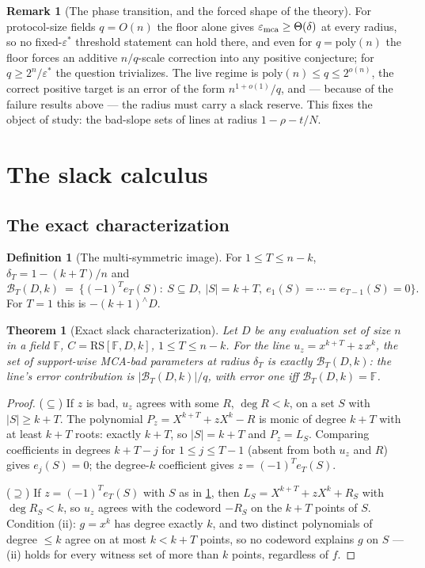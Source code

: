 \documentclass[11pt]{article}
\newtheorem{theorem}{Theorem}[section]
\theoremstyle{definition}
\newtheorem{definition}[definition]{Definition}
\newtheorem{remark}[remark]{Remark}
\newcommand{\F}{\mathbb F}
\newcommand{\eps}{\varepsilon}
\newcommand{\RS}{\mathrm{RS}}
\newcommand{\emca}{\eps_{\rm mca}}
\begin{document}
\begin{remark}[The phase transition, and the forced shape of the theory]\label{rem:phase}
For protocol-size fields $q=O(n)$ the floor alone gives $\emca\ge\Theta(\delta)$ at every radius, so no fixed-$\eps^*$ threshold statement can hold there, and even for $q=\mathrm{poly}(n)$ the floor forces an additive $n/q$-scale correction into any positive conjecture; for $q\ge2^n/\eps^*$ the question trivializes.  The live regime is $\mathrm{poly}(n)\le q\le2^{o(n)}$, the correct positive target is an error of the form $n^{1+o(1)}/q$, and --- because of the failure results above --- the radius must carry a slack reserve.  This fixes the object of study: the bad-slope sets of lines at radius $1-\rho-t/N$.
\end{remark}

\section{The slack calculus}\label{sec:calculus}

\subsection{The exact characterization}

\begin{definition}[The multi-symmetric image]\label{def:badset}
For $1\le T\le n-k$, $\delta_T=1-(k+T)/n$ and
\[
        \mathcal B_T(D,k)\ =\ \big\{(-1)^Te_T(S):\ S\subseteq D,\ |S|=k+T,\ e_1(S)=\cdots=e_{T-1}(S)=0\big\}.
\]
For $T=1$ this is $-(k+1)^{\wedge}D$.
\end{definition}

\begin{theorem}[Exact slack characterization]\label{thm:exactslack}
Let $D$ be \emph{any} evaluation set of size $n$ in a field $\F$, $C=\RS[\F,D,k]$, $1\le T\le n-k$.  For the line $u_z=x^{k+T}+z\,x^k$, the set of support-wise MCA-bad parameters at radius $\delta_T$ is \emph{exactly} $\mathcal B_T(D,k)$: the line's error contribution is $|\mathcal B_T(D,k)|/q$, with error one iff $\mathcal B_T(D,k)=\F$.
\end{theorem}

\begin{proof}
($\subseteq$)  If $z$ is bad, $u_z$ agrees with some $R$, $\deg R<k$, on a set $S$ with $|S|\ge k+T$.  The polynomial $P_z=X^{k+T}+zX^k-R$ is monic of degree $k+T$ with at least $k+T$ roots: exactly $k+T$, so $|S|=k+T$ and $P_z=L_S$.  Comparing coefficients in degrees $k+T-j$ for $1\le j\le T-1$ (absent from both $u_z$ and $R$) gives $e_j(S)=0$; the degree-$k$ coefficient gives $z=(-1)^Te_T(S)$.

($\supseteq$)  If $z=(-1)^Te_T(S)$ with $S$ as in \cref{def:badset}, then $L_S=X^{k+T}+zX^k+R_S$ with $\deg R_S<k$, so $u_z$ agrees with the codeword $-R_S$ on the $k+T$ points of $S$.  Condition (ii): $g=x^k$ has degree exactly $k$, and two distinct polynomials of degree $\le k$ agree on at most $k<k+T$ points, so no codeword explains $g$ on $S$ --- (ii) holds for every witness set of more than $k$ points, regardless of $f$.
\end{proof}
\end{document}
